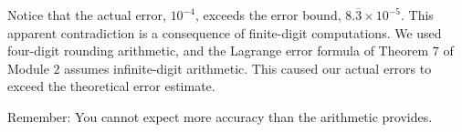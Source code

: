 Notice that the actual error, $10^{-4}$, exceeds the error bound, $8 . \overline{3} \times 10^{-5}$. This apparent contradiction is a consequence of finite-digit computations. We used four-digit rounding arithmetic, and the Lagrange error formula of Theorem $7$ of Module $2$ assumes infinite-digit arithmetic. This caused our actual errors to exceed the theoretical error estimate.

\begin{boxB}
Remember: You cannot expect more accuracy than the arithmetic provides.
\end{boxB}

%
%
%
%
%
%
%
%
